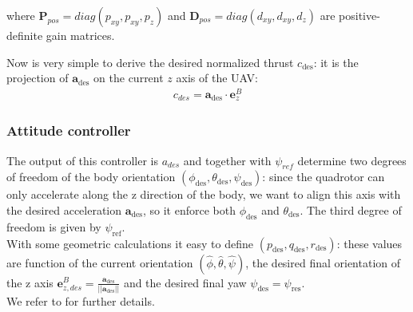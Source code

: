 where $\boldsymbol{P}_{pos} = diag(p_{xy} ,p_{xy} ,p_{z} )$ and $\boldsymbol{D}_{pos} = diag(d_{xy} ,d_{xy} ,d_{z} )$ are positive-definite gain matrices.

Now is very simple to derive the desired normalized thrust  $c_{\mathrm{des}}$: it is the projection of  $\boldsymbol{a}_{\mathrm{des}}$  on the current $z$ axis of the UAV:
\begin{align}
c_{des} = \boldsymbol{a}_{\mathrm{des}} \cdot \boldsymbol{e}_z^B
\label{eq:thrust}
\end{align}

\subsubsection{Attitude controller}
The output of this controller is $a_{des}$ and together with $\psi_{ref}$ determine two degrees of freedom of the body orientation $(\phi_\mathrm{des},\theta_\mathrm{des},\psi_\mathrm{des})$: since the quadrotor can only accelerate along the z direction of the body, we want to align this axis  with the desired acceleration $ \boldsymbol{a}_{\mathrm{des}}$, so it enforce both $\phi_{\mathrm{des}}$ and $\theta_{\mathrm{des}}$. The third degree of freedom is given by $\psi_{\mathrm{ref}}$.\\
With some geometric calculations it easy to define $(p_{\mathrm{des}},q_{\mathrm{des}},r_{\mathrm{des}})$: these values are function of the current orientation $(\hat{\phi},\hat{\theta},\hat{\psi})$, the desired final orientation of the z axis $\boldsymbol{e}_{z,des}^B = \frac{  \boldsymbol{a}_{\mathrm{des}}}{||  \boldsymbol{a}_{\mathrm{des}}||}$ and the desired final yaw $\psi_{\mathrm{des}} = \psi_{\mathrm{res}}$. \\
We refer to \cite{faessler2015automatic} for further details.



